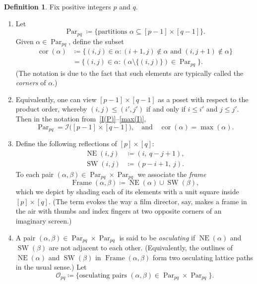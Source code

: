 \documentclass[noamsfonts,10pt]{amsart}
\newcommand{\al}{\alpha}
\newcommand{\be}{\beta}
\DeclareMathOperator{\Fr}{Frame}
\renewcommand{\O}{\mathcal{O}}
\newcommand{\NE}[1]{\operatorname{NE}(#1)}
\newcommand{\SW}[1]{\operatorname{SW}(#1)}
\DeclareMathOperator{\cor}{cor}
\DeclareMathOperator{\Par}{Par}
\newcommand{\1}{\mathbf{1}}
\theoremstyle{plain}
\theoremstyle{definition}
\newtheorem{dfn}[theorem]{Definition}
\numberwithin{equation}{section}
\begin{document}
\begin{dfn}
    \label{def:Parpq and Opq}
    Fix positive integers $p$ and $q$.
    \begin{enumerate}
        \item \label{corners} Let
        \[
            \Par_{pq} \coloneqq \Big\{ \text{partitions }\al \subseteq [p-1] \times [q-1]
            \Big\}.
        \]
        Given $\al \in \Par_{pq}$, define the subset
        \begin{align*}
            \cor(\al) &\coloneqq \Big\{ (i,j) \in \al : (i+1,j) \notin \al \text{ and } (i,j+1) \notin \al \Big\} \\
            & = \Big\{ (i,j) \in \al : (\al \setminus \{(i,j)\} ) \in \Par_{pq} \Big\}.
        \end{align*}
        (The notation is due to the fact that such elements are typically called the \emph{corners} of $\al$.)

    \item \label{poset interp} 
        Equivalently, one can view $[p-1] \times [q-1]$ as a poset with respect to the product order, whereby $(i,j) \leq (i', j')$ if and only if $i \leq i'$ and $j \leq j'$.
        Then in the notation from~\eqref{I(P)}--\eqref{max(I)},
        \[
            \Par_{pq} = \mathcal{I}\Big( [p-1] \times [q-1] \Big), \quad \text{and} \quad \cor(\al) = \max(\al).
        \]

    \item \label{frame diagram}
    Define the following reflections of $[p] \times [q]$:
    \begin{align*}
        \NE{i,j} & \coloneqq (i, \: q-j+1), \\
        \SW{i,j} &\coloneqq (p -i+1, \: j).
    \end{align*}
    To each pair $(\al,\be) \in \Par_{pq} \times \Par_{pq}$ we associate the \emph{frame}
    \[
        \Fr(\al,\be) \coloneqq \NE{\al} \cup \SW{\be},
    \]
    which we depict by shading each of its elements with a unit square inside $[p] \times [q]$.
    (The term evokes the way a film director, say,  makes a frame in the air with thumbs and index fingers at two opposite corners of an imaginary screen.)
    
  \item \label{osculating} A pair $(\al, \be) \in \Par_{pq} \times \Par_{pq}$ is said to be \emph{osculating} if $\NE{\al}$ and $\SW{\be}$ are not adjacent to each other.
  (Equivalently, the outlines of $\NE{\al}$ and $\SW{\be}$ in $\Fr(\al,\be)$ form two osculating lattice paths in the usual sense.)
    Let
        \[
            \O_{pq} \coloneqq 
            \Big\{ \text{osculating pairs $(\al, \be) \in \Par_{pq} \times \Par_{pq}$}  \Big\}.
        \]
        

\end{enumerate}
\end{dfn}
\end{document}

